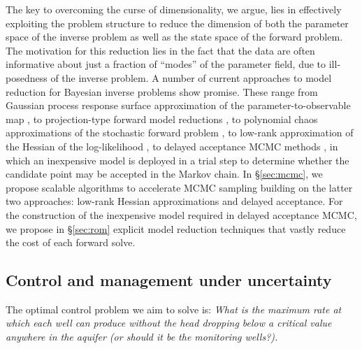 \documentclass[11pt,final]{article}%
\begin{document}
The key to overcoming the curse of dimensionality, we argue, lies in effectively exploiting the problem structure to
reduce the dimension of both the parameter space of the
inverse problem as well as the state space of the forward problem. The motivation for this reduction lies in the fact that the data are often informative about just a fraction of ``modes'' of the parameter field, due to ill-posedness of the inverse problem.
%
A number of current approaches to model reduction for Bayesian inverse problems show promise. These range from Gaussian process response surface approximation of the parameter-to-observable map
\cite{Kennedy2001, Bui-ThanhGhattasHigdon12}, to projection-type forward model reductions \cite{GalballyFidkowskiWillcoxEtAl10,lwgSISC2010,CuiMarzoukWillcox14}, to polynomial chaos approximations of the stochastic forward problem \cite{MarzoukNajm09,GhanemDoostan06, BadriZabaras04}, to low-rank approximation of the Hessian of the log-likelihood \cite{FlathWilcoxAkcelikEtAl11,MartinWilcoxBursteddeEtAl12,Bui-ThanhBursteddeGhattasEtAl12_gbfinalist,Bui-ThanhGhattasMartinEtAl13,CuiMartinMarzoukEtAl14}, to delayed acceptance MCMC methods
\cite{EfendievHouLuo06,ChristenFox05,CuiMarzoukWillcox14}, in which an inexpensive model is deployed in a trial step to determine whether the candidate point may be accepted in the Markov chain.
%
In \S\ref{sec:mcmc}, we propose scalable algorithms to accelerate MCMC sampling building on the latter two approaches: low-rank
Hessian approximations 
and delayed acceptance.  For the construction of the inexpensive model required in delayed acceptance MCMC, we propose in \S\ref{sec:rom} explicit model reduction techniques that vastly reduce the cost of each forward solve.


\subsection{Control and management under uncertainty}
\label{sec:control}

The optimal control problem we aim to solve is: \emph{What is the maximum rate at which each well can produce without the head dropping below a critical value anywhere in the aquifer (or should it be the monitoring wells?).}
\end{document}
